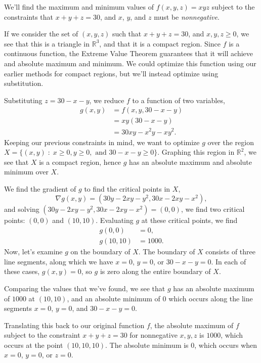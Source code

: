 \documentclass{ximera}
\begin{document}
\begin{example}
We'll find the maximum and minimum values of $f(x,y,z) = xyz$ subject to the constraints that $x+y+z=30$, and $x$, $y$, and $z$ must be \emph{nonnegative}.

If we consider the set of $(x,y,z)$ such that $x+y+z=30$, and $x,y,z\geq 0$, we see that this is a triangle in $\mathbb{R}^3$, and that it is a compact region. Since $f$ is a continuous function, the Extreme Value Theorem guarantees that it will achieve and absolute maximum and minimum. We could optimize this function using our earlier methods for compact regions, but we'll instead optimize using substitution.

Substituting $z = 30-x-y$, we reduce $f$ to a function of two variables,
\begin{align*}
g(x,y) &= f(x,y,30-x-y)\\
&= xy(30-x-y)\\
&= 30xy-x^2y-xy^2.
\end{align*}
Keeping our previous constraints in mind, we want to optimize $g$ over the region $X = \{(x,y)\;:\;x\geq 0, y\geq 0, \text{ and } 30-x-y\geq 0\}$. Graphing this region in $\mathbb{R}^2$, we see that $X$ is a compact region, hence $g$ has an absolute maximum and absolute minimum over $X$.

\begin{image}
\end{image}

We find the gradient of $g$ to find the critical points in $X$,
\[
\nabla g(x,y) = (30y-2xy-y^2, 30x-2xy-x^2),
\]
and solving $(30y-2xy-y^2, 30x-2xy-x^2) = (0,0)$, we find two critical points: $(0,0)$ and $(10,10)$. Evaluating $g$ at these critical points, we find
\begin{align*}
g(0,0) &= 0,\\
g(10,10) &= 1000.
\end{align*}
Now, let's examine $g$ on the boundary of $X$. The boundary of $X$ consists of three line segments, along which we have $x = 0$, $y=0$, or $30-x-y=0$. In each of these cases, $g(x,y) = 0$, so $g$ is zero along the entire boundary of $X$.

Comparing the values that we've found, we see that $g$ has an absolute maximum of $1000$ at $(10,10)$, and an absolute minimum of $0$ which occurs along the line segments $x=0$, $y=0$, and $30-x-y=0$.

Translating this back to our original function $f$, the absolute maximum of $f$ subject to the constraint $x+y+z=30$ for nonnegative $x,y,z$ is $1000$, which occurs at the point $(10,10,10)$. The absolute minimum is $0$, which occurs when $x=0$, $y=0$, or $z=0$.

\end{example}
\end{document}
